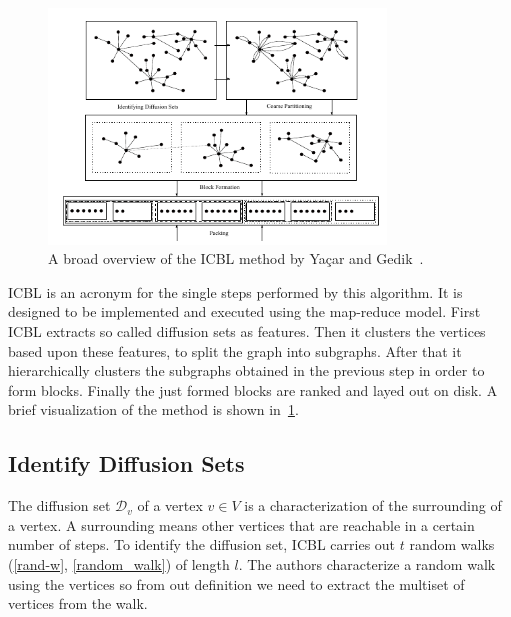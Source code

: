     \begin{figure}[htp]
        \begin{center}
            \includegraphics[keepaspectratio,width=0.8\textwidth]{img/06-rel_w/icbl.png}
        \end{center}
        \caption{A broad overview of the ICBL method by Ya\c{c}ar and Gedik~\autocite{yacsar2015scalable}.} 
        \label{icbl}
    \end{figure}

    ICBL is an acronym for the single steps performed by this algorithm. 
    It is designed to be implemented and executed using the map-reduce model.
    First ICBL extracts so called diffusion sets as features.
    Then it clusters the vertices based upon these features, to split the graph into subgraphs.
    After that it hierarchically clusters the subgraphs obtained in the previous step in order to form blocks.
    Finally the just formed blocks are ranked and layed out on disk.
    A brief visualization of the method is shown in~\ref{icbl}.
    
    \subsection*{Identify Diffusion Sets}
    The diffusion set $\mathcal{D}_v$ of a vertex $v \in V$ is a characterization of the surrounding of a vertex. 
    A surrounding means other vertices that are reachable in a certain number of steps.
    To identify the diffusion set, ICBL carries out $t$ random walks (\ref{rand-w}, \ref{random_walk}) of length $l$.
    The authors characterize a random walk using the vertices so from out definition we need to extract the multiset of vertices from the walk.
    
